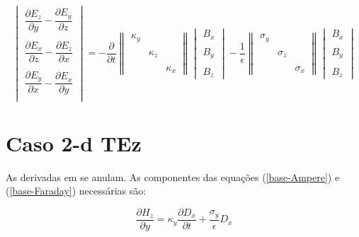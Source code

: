 \documentclass[a4paper,10pt]{article}
\begin{document}
\begin{equation}
\begin{vmatrix}
 \dfrac{\partial E_z}{\partial y} - \dfrac{\partial E_y}{\partial z}  \\
\\
 \dfrac{\partial E_x}{\partial z} - \dfrac{\partial E_z}{\partial x}  \\
\\ 
\dfrac{\partial E_y}{\partial x} - \dfrac{\partial E_x}{\partial y}  \\
  \end{vmatrix} 
= -\dfrac{\partial}{\partial t} \begin{Vmatrix}
 \kappa_y &  &  \\ \\
  & \kappa_z &  \\ \\
  &  & \kappa_x 
\end{Vmatrix} 
 \begin{vmatrix}
 B_x \\ \\
 B_y \\ \\
 B_z 
 \end{vmatrix}  
-\frac{1}{\epsilon}
\begin{Vmatrix}
 \sigma_y &  &  \\ \\
  & \sigma_z &  \\ \\
  &  & \sigma_x 
\end{Vmatrix} 
 \begin{vmatrix}
 B_x \\ \\
 B_y \\ \\
 B_z 
  \end{vmatrix} \label{base-Faraday}
\end{equation}

\section{Caso 2-d TEz}

As derivadas em  se anulam. As componentes das equações (\ref{base-Ampere}) e (\ref{base-Faraday}) necessárias são:

\begin{equation}
\dfrac{\partial H_z}{\partial y}=\kappa_y\dfrac{\partial D_x}{\partial t}+ \frac{\sigma_y}{\epsilon}D_x
\end{equation}
\end{document}
